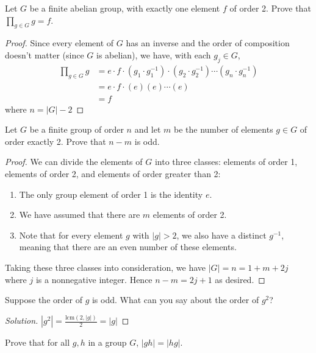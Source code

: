 \documentclass[12pt]{article}
\newenvironment{problem}[2][Problem]{\begin{trivlist}
\item[\hskip \labelsep {\bfseries #1}\hskip \labelsep {\bfseries #2.}]}{\end{trivlist}}
\newcommand{\lcm}[1]{\text{lcm}(#1)}
\newenvironment{solution}
  {\renewcommand\qedsymbol{$\blacksquare$}\begin{proof}[Solution]}
{\end{proof}}
\begin{document}
\begin{problem}{1.8}
  Let $G$ be a finite abelian group, with exactly one element $f$ of order 2.
  Prove that $\prod_{g\in G} g = f$.
\end{problem}
\begin{proof}
  Since every element of $G$ has an inverse and the order of composition
  doesn't matter (since $G$ is abelian), we have, with each $g_j \in G$,
  \begin{align*}
    \prod_{g\in G} g &= e\cdot f\cdot 
    (g_1\cdot g_1^{-1})\cdot (g_2\cdot g_2^{-1})\cdots(g_n\cdot g_n^{-1})\\
    &= e\cdot f\cdot (e)(e)\cdots(e)\\
    &= f
  \end{align*}
  where $n = |G| - 2$
\end{proof}
\begin{problem}{1.9}
  Let $G$ be a finite group of order $n$ and let $m$ be the number of elements
  $g\in G$ of order exactly 2. Prove that $n-m$ is odd.
\end{problem}
\begin{proof}
  We can divide the elements of $G$ into three classes: elements of order 1,
  elements of order 2, and elements of order greater than 2:
  \begin{enumerate}
    \item The only group element of order 1 is the identity $e$.
    \item We have assumed that there are $m$ elements of order 2.
    \item Note that for every element $g$ with $|g|>2$, we also have a distinct
      $g^{-1}$, meaning that there are an even number of these elements.
  \end{enumerate}
  Taking these three classes into consideration, we have 
  $|G| = n = 1 + m + 2j$ where $j$ is a nonnegative integer. Hence
  $n-m=2j+1$ as desired.
\end{proof}
\begin{problem}{1.10}
  Suppose the order of $g$ is odd. What can you say about the order of $g^2$?
\end{problem}
\begin{solution}
  $|g^2| = \frac{\lcm{2,|g|}}{2}=|g|$
\end{solution}
\begin{problem}{1.11}
  Prove that for all $g,h$ in a group $G$, $|gh| = |hg|$.
\end{problem}
\end{document}
